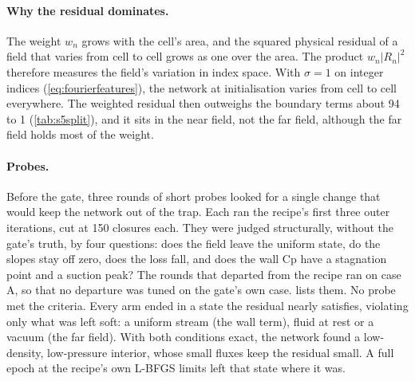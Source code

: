 \documentclass[11pt]{article}
\begin{document}
\paragraph{Why the residual dominates.}
The weight $w_n$ grows with the cell's area, and the squared physical residual of a field that
varies from cell to cell grows as one over the area. The product $w_n|R_n|^2$ therefore measures
the field's variation in index space. With $\sigma = 1$ on integer indices
(\cref{eq:fourierfeatures}), the network at initialisation varies from cell to cell everywhere.
The weighted residual then outweighs the boundary terms about 94 to 1
(\cref{tab:s5split}), and it sits in the near field, not the far field, although the far field
holds most of the weight.

\paragraph{Probes.}
Before the gate, three rounds of short probes looked for a single change that would keep the
network out of the trap. Each ran the recipe's first three outer iterations, cut at 150 closures
each. They were judged structurally, without the gate's truth, by four questions: does the field
leave the uniform state, do the slopes stay off zero, does the loss fall, and does the wall Cp have
a stagnation point and a suction peak? The rounds that departed from the recipe ran on case A,
so that no departure was tuned on the gate's own case.
 lists them. No probe met the criteria. Every arm ended in a state the residual
nearly satisfies, violating only what was left soft: a uniform stream (the wall term), fluid at
rest or a vacuum (the far field). With both conditions exact, the network found a low-density,
low-pressure interior, whose small fluxes keep the residual small. A full epoch at the recipe's
own L-BFGS limits left that state where it was.
\end{document}
